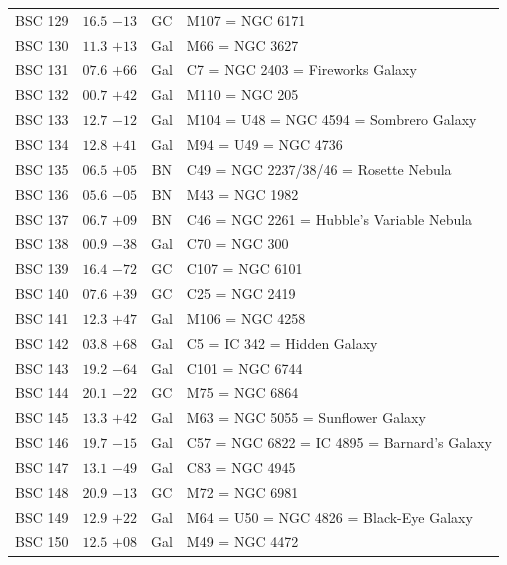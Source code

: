 \begin{table}[t]
\begin{tabularx}{\linewidth}{lccX}
BSC 129 &$16.5$ $-13$&GC &M107 = NGC 6171\\
BSC 130 &$11.3$ $+13$&Gal&M66 = NGC 3627\\
BSC 131 &$07.6$ $+66$&Gal&C7 = NGC 2403 = Fireworks Galaxy\\
BSC 132 &$00.7$ $+42$&Gal&M110 = NGC 205\\
BSC 133 &$12.7$ $-12$&Gal&M104 = U48 = NGC 4594 = Sombrero Galaxy\\
BSC 134 &$12.8$ $+41$&Gal&M94 = U49 = NGC 4736\\
BSC 135 &$06.5$ $+05$&BN &C49 = NGC 2237/38/46 = Rosette Nebula\\
BSC 136 &$05.6$ $-05$&BN &M43 = NGC 1982\\
BSC 137 &$06.7$ $+09$&BN &C46 = NGC 2261 = Hubble's Variable Nebula\\
BSC 138 &$00.9$ $-38$&Gal&C70 = NGC 300\\
BSC 139 &$16.4$ $-72$&GC &C107 = NGC 6101\\
BSC 140 &$07.6$ $+39$&GC &C25 = NGC 2419\\
BSC 141 &$12.3$ $+47$&Gal&M106 = NGC 4258\\
BSC 142 &$03.8$ $+68$&Gal&C5 = IC 342 = Hidden Galaxy\\
BSC 143 &$19.2$ $-64$&Gal&C101 = NGC 6744\\
BSC 144 &$20.1$ $-22$&GC &M75 = NGC 6864\\
BSC 145 &$13.3$ $+42$&Gal&M63 = NGC 5055 = Sunflower Galaxy\\
BSC 146 &$19.7$ $-15$&Gal&C57 = NGC 6822 = IC 4895 = Barnard's Galaxy\\
BSC 147 &$13.1$ $-49$&Gal&C83 = NGC 4945\\
BSC 148 &$20.9$ $-13$&GC &M72 = NGC 6981\\
BSC 149 &$12.9$ $+22$&Gal&M64 = U50 = NGC 4826 = Black-Eye Galaxy\\
BSC 150 &$12.5$ $+08$&Gal&M49 = NGC 4472\\

        \hline
    \end{tabularx}
\end{table}
\clearpage

